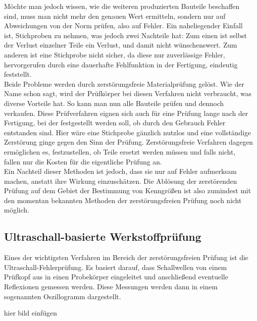 \documentclass[reducespace,stylepage,semiarbeit]{spezidoc}
\begin{document}
Möchte man jedoch wissen, wie die weiteren produzierten Bauteile beschaffen sind, muss man nicht mehr den genauen Wert ermitteln, sondern nur auf Abweichungen von der Norm prüfen, also auf Fehler. 
Ein naheliegender Einfall ist, Stichproben zu nehmen, was jedoch zwei Nachteile hat: Zum einen ist selbst der Verlust einzelner Teile ein Verlust, und damit nicht wünschenswert. 
Zum anderen ist eine Stichprobe nicht sicher, da diese nur zuverlässige Fehler, hervorgerufen durch eine dauerhafte Fehlfunktion in der Fertigung, eindeutig feststellt.\\
Beide Probleme werden durch zerstörungsfreie Materialprüfung gelöst. 
Wie der Name schon sagt, wird der Prüfkörper bei diesen Verfahren nicht verbraucht, was diverse Vorteile hat. 
So kann man nun alle Bauteile prüfen und dennoch verkaufen. 
Diese Prüfverfahren eignen sich auch für eine Prüfung lange nach der Fertigung, bei der festgestellt werden soll, ob durch den Gebrauch Fehler entstanden sind. 
Hier wäre eine Stichprobe gänzlich nutzlos und eine vollständige Zerstörung ginge gegen den Sinn der Prüfung. 
Zerstörungsfreie Verfahren dagegen ermöglichen es, festzustellen, ob Teile ersetzt werden müssen und falls nicht, fallen nur die Kosten für die eigentliche Prüfung an.\\
Ein Nachteil dieser Methoden ist jedoch, dass sie nur auf Fehler aufmerksam machen, anstatt ihre Wirkung einzuschätzen. 
Die Ablösung der zerstörenden Prüfung auf dem Gebiet der Bestimmung von Kenngrößen ist also zumindest mit den momentan bekannten Methoden der zerstörungsfreien Prüfung noch nicht möglich.

\subsection{Ultraschall-basierte Werkstoffprüfung}
Eines der wichtigsten Verfahren im Bereich der zerstörungsfreien Prüfung ist die Ultraschall-Fehlerprüfung. 
Es basiert darauf, dass Schallwellen von einem Prüfkopf aus in einen Probekörper eingeleitet und anschließend eventuelle Reflexionen gemessen werden. 
Diese Messungen werden dann in einem sogenannten Oszillogramm dargestellt.

hier bild einfügen\\
\end{document}
